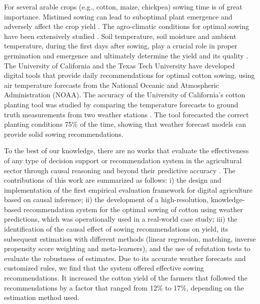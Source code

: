 \documentclass[letterpaper]{article} %
\begin{document}
For several arable crops (e.g., cotton, maize, chickpea) sowing time is of great importance. Mistimed sowing can lead to suboptimal plant emergence and adversely affect the crop yield \cite{huang2016different,nielsen2002delayed,richards2022impact}.
The agro-climatic conditions for optimal sowing  have been extensively studied \cite{freeland2006agrometeorology,boman2005soil}. Soil temperature, soil moisture and ambient temperature, during the first days after sowing, play a crucial role in proper germination and emergence and ultimately determine the yield and its quality \cite{bradow2010germination,bauer1998planting}. The University of California \cite{california} and the Texas Tech University \cite{barbato2011temperature} have developed digital tools that provide daily recommendations for optimal cotton sowing, using air temperature forecasts from the National Oceanic and Atmospheric Administration (NOAA). The accuracy of the University of California's cotton planting tool was studied by comparing the temperature forecasts to ground truth measurements from two weather stations \cite{munier2004accuracy}. The tool forecasted the correct planting conditions \cite{kerby1989weather} 75\% of the time, showing that weather forecast models can provide solid sowing recommendations.

To the best of our knowledge, there are no works that evaluate the effectiveness of any type of decision support or recommendation system in the agricultural sector through causal reasoning and
beyond their predictive accuracy \cite{luma2020causal, pasquel2022review}. The contributions of this work are summarized as follows: i) the design and implementation of the first empirical evaluation framework for digital agriculture based on causal inference; ii) the development of a high-resolution, knowledge-based recommendation system for the optimal sowing of cotton using weather predictions, which was operationally used in a real-world case study;
iii) the identification of the causal effect of sowing recommendations on yield, its subsequent estimation with different methods (linear regression, matching, inverse propensity score weighting and meta-learners), and the use of refutation tests to evaluate the robustness of estimates. Due to its accurate weather forecasts and customized rules, we find that the system offered effective sowing recommendations. It increased the cotton yield of the farmers that
followed the recommendations by a factor that ranged from 12\% to 17\%, depending on the estimation method used.
\end{document}
